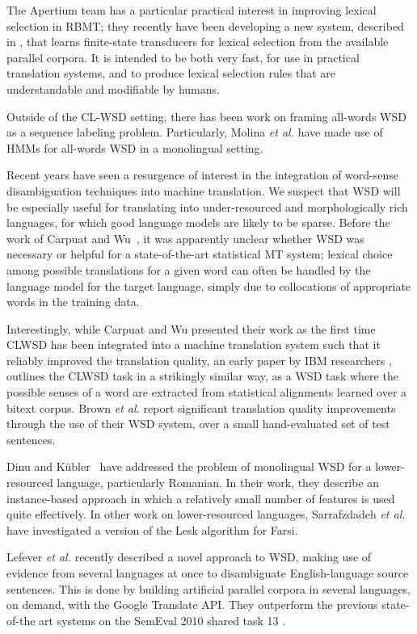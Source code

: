 The Apertium team has a particular practical interest in improving lexical
selection in RBMT; they recently have been developing
a new system, described in \cite{tyers-fst}, that learns finite-state
transducers for lexical selection from the available parallel corpora. It is
intended to be both very fast, for use in practical translation systems, and
to produce lexical selection rules that are understandable and modifiable by
humans.

Outside of the CL-WSD setting, there has been work on framing all-words WSD as
a sequence labeling problem. Particularly, Molina \textit{et al.}
\cite{DBLP:conf/iberamia/MolinaPS02} have made use of HMMs for all-words
WSD in a monolingual setting.

Recent years have seen a resurgence of interest in the integration of
word-sense disambiguation techniques into machine translation.  We suspect that
WSD will be especially useful for translating into under-resourced and
morphologically rich languages, for which good language models are likely to be
sparse. Before the work of 
Carpuat and Wu~\cite{improvingsmtwsd}, it was apparently unclear whether
WSD was necessary or helpful for a state-of-the-art statistical MT system;
lexical choice among possible translations for a given word can often be
handled by the language model for the target language, simply due to
collocations of appropriate words in the training data.

Interestingly, while Carpuat and Wu presented their work as the first time
CLWSD has been integrated into a machine translation system such that it
reliably improved the translation quality, an early paper by IBM researchers
\cite{Brown91word-sensedisambiguation}, outlines the CLWSD task in a strikingly
similar way, as a WSD task where the possible senses of a word are extracted
from statistical alignments learned over a bitext corpus. Brown \textit{et al.}
report significant translation quality improvements through the use of their
WSD system, over a small hand-evaluated set of test sentences.

Dinu and Kübler~\cite{Dinu07} have addressed the problem of monolingual WSD for
a lower-resourced language, particularly Romanian. In their work, they describe
an instance-based approach in which a relatively small number of features is
used quite effectively. In other work on lower-resourced languages,
Sarrafzdadeh \textit{et al.} have investigated a version of the Lesk algorithm
for Farsi.

Lefever \textit{et al.} recently described a novel approach to WSD, making use
of evidence from several languages at once to disambiguate English-language
source sentences. This is done by building artificial parallel corpora in
several languages, on demand, with the Google Translate API. They outperform
the previous state-of-the art systems on the SemEval 2010 shared task 13
\cite{lefever-hoste-decock:2011:ACL-HLT2011}.
